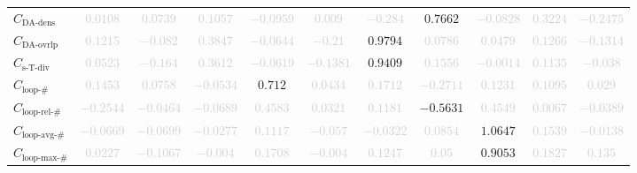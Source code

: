 \documentclass{standalone}
\newcommand{\dadensname}{\text{DA-dens}}
\newcommand{\dadens}{C_{\dadensname}}
\newcommand{\daoverlapname}{\text{DA-ovrlp}}
\newcommand{\daoverlap}{C_{\daoverlapname}}
\newcommand{\simpletracedivname}{\text{s-T-div}}
\newcommand{\simpletracediv}{C_{\simpletracedivname}}
\newcommand{\loopnumname}{\text{loop-\#}}
\newcommand{\loopnum}{C_{\loopnumname}}
\newcommand{\looprelnumname}{\text{loop-rel-\#}}
\newcommand{\looprelnum}{C_{\looprelnumname}}
\newcommand{\loopavgname}{\text{loop-avg-\#}}
\newcommand{\loopavg}{C_{\loopavgname}}
\newcommand{\loopmaxname}{\text{loop-max-\#}}
\newcommand{\loopmax}{C_{\loopmaxname}}
\begin{document}
\begin{tabular}{lcccccccccc}
$\dadens$ & \textcolor{lightgray}{$0.0108$} & \textcolor{lightgray}{$0.0739$} & \textcolor{lightgray}{$0.1057$} & \textcolor{lightgray}{$-0.0959$} & \textcolor{lightgray}{$0.009$} & \textcolor{lightgray}{$-0.284$} & $0.7662$ & \textcolor{lightgray}{$-0.0828$} & \textcolor{lightgray}{$0.3224$} & \textcolor{lightgray}{$-0.2475$} \\ 
$\daoverlap$ & \textcolor{lightgray}{$0.1215$} & \textcolor{lightgray}{$-0.082$} & \textcolor{lightgray}{$0.3847$} & \textcolor{lightgray}{$-0.0644$} & \textcolor{lightgray}{$-0.21$} & $0.9794$ & \textcolor{lightgray}{$0.0786$} & \textcolor{lightgray}{$0.0479$} & \textcolor{lightgray}{$0.1266$} & \textcolor{lightgray}{$-0.1314$} \\ 
$\simpletracediv$ & \textcolor{lightgray}{$0.0523$} & \textcolor{lightgray}{$-0.164$} & \textcolor{lightgray}{$0.3612$} & \textcolor{lightgray}{$-0.0619$} & \textcolor{lightgray}{$-0.1381$} & $0.9409$ & \textcolor{lightgray}{$0.1556$} & \textcolor{lightgray}{$-0.0014$} & \textcolor{lightgray}{$0.1135$} & \textcolor{lightgray}{$-0.038$} \\ 
$\loopnum$ & \textcolor{lightgray}{$0.1453$} & \textcolor{lightgray}{$0.0758$} & \textcolor{lightgray}{$-0.0534$} & $0.712$ & \textcolor{lightgray}{$0.0434$} & \textcolor{lightgray}{$0.1712$} & \textcolor{lightgray}{$-0.2711$} & \textcolor{lightgray}{$0.1231$} & \textcolor{lightgray}{$0.1095$} & \textcolor{lightgray}{$0.029$} \\ 
$\looprelnum$ & \textcolor{lightgray}{$-0.2544$} & \textcolor{lightgray}{$-0.0464$} & \textcolor{lightgray}{$-0.0689$} & \textcolor{lightgray}{$0.4583$} & \textcolor{lightgray}{$0.0321$} & \textcolor{lightgray}{$0.1181$} & $-0.5631$ & \textcolor{lightgray}{$0.4549$} & \textcolor{lightgray}{$0.0067$} & \textcolor{lightgray}{$-0.0389$} \\ 
$\loopavg$ & \textcolor{lightgray}{$-0.0669$} & \textcolor{lightgray}{$-0.0699$} & \textcolor{lightgray}{$-0.0277$} & \textcolor{lightgray}{$0.1117$} & \textcolor{lightgray}{$-0.057$} & \textcolor{lightgray}{$-0.0322$} & \textcolor{lightgray}{$0.0854$} & $1.0647$ & \textcolor{lightgray}{$0.1539$} & \textcolor{lightgray}{$-0.0138$} \\ 
$\loopmax$ & \textcolor{lightgray}{$0.0227$} & \textcolor{lightgray}{$-0.1067$} & \textcolor{lightgray}{$-0.004$} & \textcolor{lightgray}{$0.1708$} & \textcolor{lightgray}{$-0.004$} & \textcolor{lightgray}{$0.1247$} & \textcolor{lightgray}{$0.05$} & $0.9053$ & \textcolor{lightgray}{$0.1827$} & \textcolor{lightgray}{$0.135$} \\ 

\end{tabular}
\end{document}
